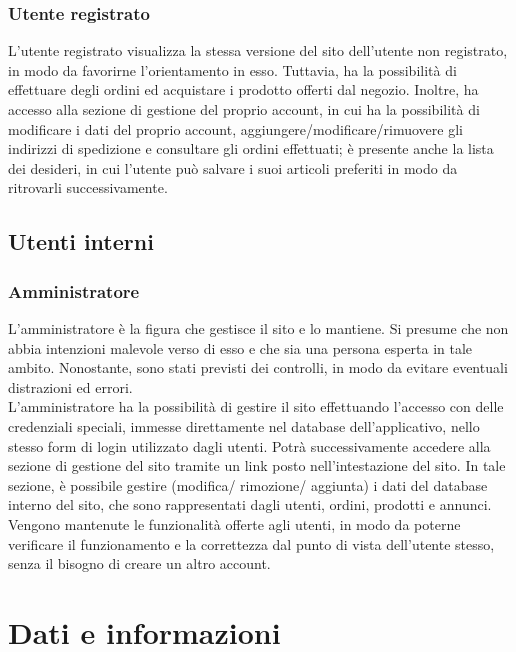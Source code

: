 		\subsubsection{Utente registrato}
		L'utente registrato visualizza la stessa versione del sito dell'utente non registrato, in modo da favorirne l'orientamento in esso. Tuttavia, ha la possibilità di effettuare degli ordini ed acquistare i prodotto offerti dal negozio. Inoltre, ha accesso alla sezione di gestione del proprio account, in cui ha la possibilità di modificare i dati del proprio account, aggiungere/modificare/rimuovere gli indirizzi di spedizione e %
		consultare gli ordini effettuati; è presente anche la lista dei desideri, in cui l'utente può salvare i suoi articoli preferiti in modo da ritrovarli successivamente.

	\subsection{Utenti interni}
		\subsubsection{Amministratore}
		L'amministratore è la figura che gestisce il sito e lo mantiene. Si presume che non abbia intenzioni malevole verso di esso e che sia una persona esperta in tale ambito. Nonostante, sono stati previsti dei controlli, in modo da evitare eventuali distrazioni ed errori. \\
		L'amministratore ha la possibilità di gestire il sito effettuando l'accesso con delle credenziali speciali, immesse direttamente nel database dell'applicativo, nello stesso form di login utilizzato dagli utenti. Potrà successivamente accedere alla sezione di gestione del sito tramite un link posto nell'intestazione del sito. In tale sezione, è possibile gestire (modifica/ rimozione/ aggiunta) i dati del database interno del sito, che sono rappresentati dagli utenti, ordini, prodotti e annunci. \\
		Vengono mantenute le funzionalità offerte agli utenti, in modo da poterne verificare il funzionamento e la correttezza dal punto di vista dell'utente stesso, senza il bisogno di creare un altro account.

\section{Dati e informazioni} %
